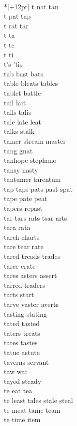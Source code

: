 \vspace{14pt}
\noindent\notextbf{\LargeT}\\*[+12pt]
t nat tan  \\
t pat tap  \\
t rat tar  \\
t ta \\
t te \\
t ti \\
t's 'tis \\
tab bast bats \\
table bleats tables \\
tablet battle\\
tail lait\\
tails talis\\
tale late leat\\
talks stalk\\
tamer stream master \\
tang gnat\\
tanhope stephano \\
tansy nasty\\
tantumer tarentum\\
tap taps pats past spat \\
tape pate peat\\
tapers repast\\
tar tars rats tsar arts \\
tara rata\\
tarch charts \\
tare tear rate\\
tared treads trades \\
taree erate\\
tares asters assert \\
tarred traders \\
tarts start\\
tarve vaster averts \\
tasting stating\\
tated tasted \\
taters treats\\
tates tastes \\
tatue astute \\
taverns servant\\
taw wat\\
tayed steady \\
te eat tea \\
te least tales stale steal   \\
te meat tame team  \\
te time item  \\
